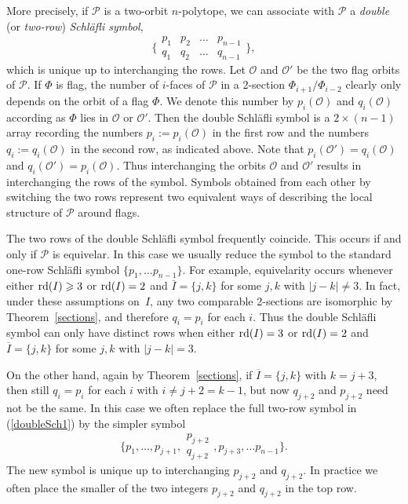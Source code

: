 \documentclass[12pt]{article}
\renewcommand{\bar}{\overline}
\renewcommand{\>}{\rangle}
\renewcommand{\geq}{\geqslant}
\theoremstyle{definition}\newtheorem{definition}{Definition}[section]
\begin{document}
More precisely, if $\mathcal{P}$ is a two-orbit $n$-polytope, we can associate with $\mathcal{P}$ a {\em double\/} (or {\em two-row\/}) {\em Schl\"afli symbol\/}, 
\begin{equation}
\label{doubleSch1}
\Big\{ 
\begin{matrix} 
p_1 &\! p_2 &\!\ldots &\! p_{n-1} \\
q_1 &\! q_2 &\! \ldots &\! q_{n-1}
\end{matrix} 
\Big\},
\end{equation}
which is unique up to interchanging the rows. Let $\mathcal{O}$ and $\mathcal{O}'$ be the two flag orbits of $\mathcal{P}$. If $\Phi$ is  flag, the number of $i$-faces of $\mathcal{P}$ in a 2-section $\Phi_{i+1}/ \Phi_{i-2}$ clearly only depends on the orbit of a flag $\Phi$.  We denote this number by $p_{i}(\mathcal{O})$ and $q_{i}(\mathcal{O})$ according as $\Phi$ lies in $\mathcal{O}$ or $\mathcal{O}'$. Then the double Schl\"afli symbol is a $2\times (n-1)$ array recording the numbers $p_i:=p_i(\mathcal{O})$ in the first row and the numbers $q_i:=q_i(\mathcal{O})$ in the second row, as indicated above. Note that $p_i(\mathcal{O}')= q_i(\mathcal{O})$ and $q_i(\mathcal{O}')=p_i(\mathcal{O})$. Thus interchanging the orbits $\mathcal{O}$ and $\mathcal{O}'$ results in interchanging the rows of the symbol. Symbols obtained from each other by switching the two rows represent two equivalent ways of describing the local structure of $\mathcal{P}$ around flags.

The two rows of the double Schl\"afli symbol frequently coincide. This occurs if and only if $\mathcal{P}$ is equivelar. In this case we usually reduce the symbol to the standard one-row Schl\"afli symbol $\{p_1, \dots p_{n-1}\}$.  For example, equivelarity occurs whenever  either ${\rm rd}(I)\geq 3$ or ${\rm rd}(I)=2$ and $\bar{I} = \{ j, k\}$ for some $j,k$ with $|j-k| \neq 3$. In fact, under these assumptions on~$I$, any two comparable 2-sections are isomorphic by Theorem~\ref{sections}, and therefore $q_i=p_i$ for each $i$. Thus the double Schl\"afli symbol can only have distinct rows when either ${\rm rd}(I)=3$ or ${\rm rd}(I)=2$ and $\bar{I} = \{j, k\}$ for some $j,k$ with $|j-k|=3$.

On the other hand, again by Theorem~\ref{sections}, if $\bar{I}=\{j,k\}$ with $k=j+3$, then still $q_i=p_i$ for each $i$ with $i \neq j+2=k-1$, but now $q_{j+2}$ and $p_{j+2}$ need not be the same. In this case we often replace the full two-row symbol in (\ref{doubleSch1}) by the simpler symbol
\begin{equation}
\label{doubleSch2}
\Big\{p_1,\dots,p_{j+1}, 
\begin{matrix} p_{j+2} \\ q_{j+2} \end{matrix}, 
p_{j+3}, \dots p_{n-1}\Big\}.
\end{equation}
The new symbol is unique up to interchanging $p_{j+2}$ and $q_{j+2}$. In practice we often place the smaller of the two integers $p_{j+2}$ and $q_{j+2}$ in the top row.
\end{document}
